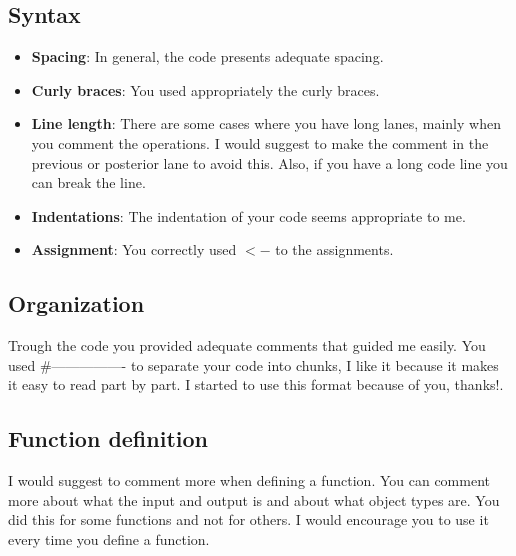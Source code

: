 \documentclass[11 pt]{article}
\begin{document}
\subsection{Syntax}
\begin{itemize}
	\item \textbf{Spacing}: In general, the code presents adequate spacing. 
	\item \textbf{Curly braces}: You used appropriately the curly braces. 
	\item \textbf{Line length}: There are some cases where you have long lanes, mainly when you comment the operations. I would suggest to make the comment in the previous or posterior lane to avoid this. Also, if you have a long code line you can break the line.
	\item \textbf{Indentations}: The indentation of your code seems appropriate to me.
	\item \textbf{Assignment}: You correctly used $<-$ to the assignments.
\end{itemize}

\subsection{Organization}
Trough the code you provided adequate comments that guided me easily. You used \#---------------- to separate your code into chunks, I like it because it makes it easy to read part by part.  I started to use this format because of you, thanks!.

\subsection{Function definition}
I would suggest to comment more when defining a function. You can comment more about what the input and output is and about what object types are. You did this for some functions and not for others. I would encourage you to use it every time you define a function. 
\end{document}
